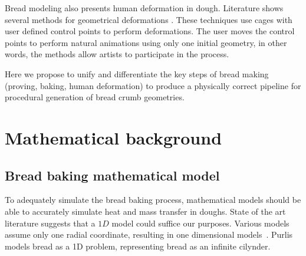\documentclass[final,5p,times]{elsarticle}
\begin{document}
Bread modeling also presents human deformation in dough. Literature shows several methods for geometrical deformations \cite{Lipman2008,Floater2003}. These techniques use cages with user defined control points to perform deformations. The user moves the control points to perform natural animations using only one initial geometry, in other words, the methods allow artists to participate in the process.

Here we propose to unify and differentiate the key steps of bread making (proving, baking, human deformation) to produce a physically correct pipeline for procedural generation of bread crumb geometries. 


\section{Mathematical background}

\subsection{Bread baking mathematical model}
To adequately simulate the bread baking process, mathematical models should be able to accurately simulate heat and mass transfer in doughs. State of the art literature suggests that a $1D$ model could suffice our purposes. Various models assume only one radial coordinate, resulting in one dimensional models~\cite{Thorvaldsson1999,Purlis2010}. Purlis~\cite{Purlis2010} models bread as a 1D problem, representing bread as an infinite cilynder. 
\end{document}
